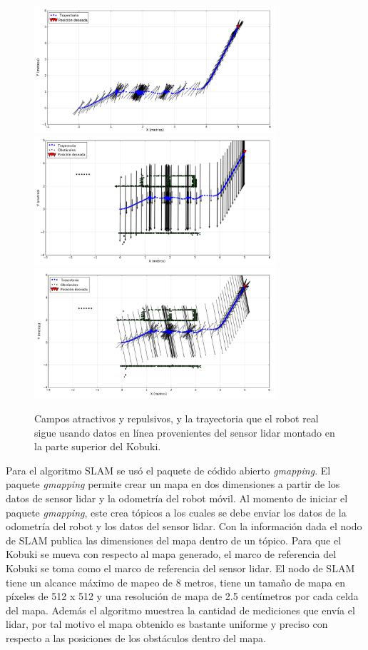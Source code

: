 \begin{figure}%
  \centering \footnotesize
  \includegraphics[width=0.80\textwidth]{images/fattr_slam.png}
  \includegraphics[width=0.80\textwidth]{images/frep_slam.png}
  \includegraphics[width=0.80\textwidth]{images/fnav_slam.png}
  \captionsetup{font=footnotesize}
  \caption{Campos atractivos y repulsivos, y la trayectoria que el robot real sigue 
  usando datos en línea provenientes del sensor lidar montado en la parte superior del 
  Kobuki.}
  \label{fig:Kbki_slam}
\end{figure}

Para el algoritmo SLAM se usó el paquete de códido abierto \textit{gmapping}. El paquete 
\textit{gmapping} permite crear un mapa en dos dimensiones a partir de los datos de sensor 
lidar y la odometría del robot móvil. Al momento de iniciar el paquete \textit{gmapping}, 
este crea tópicos a los cuales se debe enviar los datos de la odometría del robot y los datos 
del sensor lidar. Con la información dada el nodo de SLAM publica las dimensiones del mapa 
dentro de un tópico. Para que el Kobuki se mueva con respecto al mapa generado, el marco de 
referencia del Kobuki se toma como el marco de referencia del sensor lidar. El nodo de 
SLAM tiene un alcance máximo de mapeo de 8 metros, tiene un tamaño de mapa en píxeles de 
512 x 512 y una resolución de mapa de 2.5 centímetros por cada celda del mapa. Además el 
algoritmo muestrea la cantidad de mediciones que envía el lidar, por tal motivo el mapa 
obtenido es bastante uniforme y preciso con respecto a las posiciones de los obstáculos 
dentro del mapa. 

